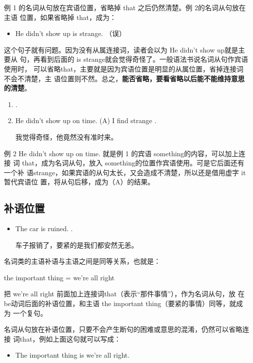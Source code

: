 例 1 的名词从句放在宾语位置，省略掉 that 之后仍然清楚。例 2的名词从句放在主语
位置，如果省略掉 that，成为：
\begin{itemize}
\item He didn't show up is strange. （误）
\end{itemize}
这个句子就有问题。因为没有从属连接词，读者会以为 He didn't show up就是主要从
句，再看到后面的 is strange就会觉得奇怪了。一般语法书说名词从句作宾语使用时，
可以省略that，主要就是因为宾语位置是明显的从属位置，省掉连接词不会不清楚，主
语位置则不然。总之，\textbf{能否省略，要看省略以后能不能维持意思的清楚}。

\begin{enumerate}
\item {}   .
\item He didn't show up on time.
\reitem (A) I find  strange .

我觉得奇怪，他竟然没有准时来。
\end{enumerate}
例 2 He didn't show up on time. 就是例 1 的宾语 something的内容，可以加上连接
词 that，成为名词从句，放入 something的位置作宾语使用。可是它后面还有一个补
语strange，如果宾语的从句太长，又会造成不清楚，所以还是借用虚字 it暂代宾语位
置，将从句后移，成为（A）的结果。

\subsection{补语位置}

\begin{itemize}
\item The car is ruined.   .

  车子报销了，要紧的是我们都安然无恙。
\end{itemize}

名词类的主语补语与主语之间是同等关系，也就是：

the important thing = we're all right

把 we're all right 前面加上连接词that（表示“那件事情”），作为名词从句，放
在 be动词后面的补语位置，和主语 the important thing（要紧的事情）同等，就成为
一个复句。

名词从句放在补语位置，只要不会产生断句的困难或意思的混淆，仍然可以省略连接
词that，例如上面这句就可以写成：
\begin{itemize}
\item The important thing is we're all right.
\end{itemize}

